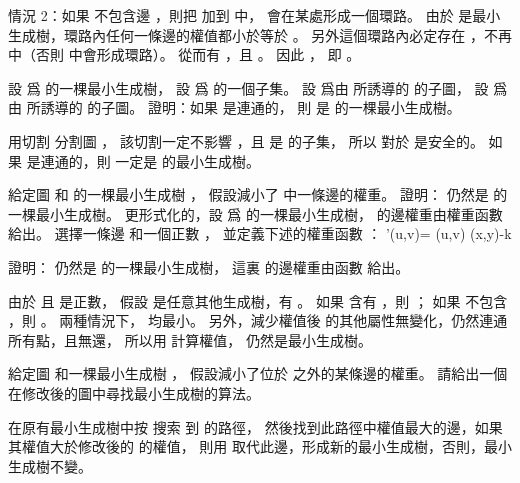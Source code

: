 情況 2：如果  不包含邊 ，則把  加到  中，
會在某處形成一個環路。
由於  是最小生成樹，環路內任何一條邊的權值都小於等於 。
另外這個環路內必定存在 ，不再  中（否則  中會形成環路）。
從而有 ，且 。
因此 ，
即 。
\stopANSWER

\startEXERCISE
設  爲  的一棵最小生成樹，
設  爲  的一個子集。
設  爲由  所誘導的  的子圖，
設  爲由  所誘導的  的子圖。
證明：如果  是連通的，
則  是  的一棵最小生成樹。
\stopEXERCISE

\startANSWER
用切割  分割圖 ，
該切割一定不影響 ，且  是  的子集，
所以  對於  是安全的。
如果  是連通的，則  一定是  的最小生成樹。
\stopANSWER

\startEXERCISE
給定圖  和  的一棵最小生成樹 ，
假設減小了  中一條邊的權重。
證明：  仍然是  的一棵最小生成樹。
更形式化的，設  爲  的一棵最小生成樹，  的邊權重由權重函數 \m{\omega} 給出。
選擇一條邊  和一個正數 ，
並定義下述的權重函數 ：
\startformula
\omega'(u,v)=\startcases
\NC \omega(u,v) \MC {} \NR
\NC \omega(x,y)-k \MC {} \NR
\stopcases
\stopformula

證明：  仍然是  的一棵最小生成樹，
這裏  的邊權重由函數  給出。
\stopEXERCISE

\startANSWER
由於  且  是正數，
假設  是任意其他生成樹，有 。
如果  含有 ，則 ；
如果  不包含 ，則 。
兩種情況下，  均最小。
另外，減少權值後  的其他屬性無變化，仍然連通所有點，且無還，
所以用  計算權值，  仍然是最小生成樹。
\stopANSWER

\startEXERCISE\DIFFICULT
給定圖  和一棵最小生成樹 ，
假設減小了位於  之外的某條邊的權重。
請給出一個在修改後的圖中尋找最小生成樹的算法。
\stopEXERCISE

\startANSWER
在原有最小生成樹中按  搜索  到  的路徑，
然後找到此路徑中權值最大的邊，如果其權值大於修改後的  的權值，
則用  取代此邊，形成新的最小生成樹，否則，最小生成樹不變。
\stopANSWER

\stopsection
